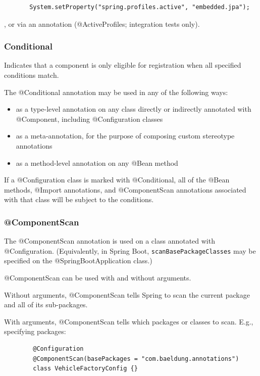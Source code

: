 \documentclass{scrartcl}
\begin{document}
   \begin{lstlisting}
       System.setProperty("spring.profiles.active", "embedded.jpa");
   \end{lstlisting}

   , or via an annotation (@ActiveProfiles; integration tests only).

\subsubsection{Conditional}

Indicates that a component is only eligible for registration when all specified conditions match.

The @Conditional annotation may be used in any of the following ways:

\begin{itemize}
    \item as a type-level annotation on any class directly or indirectly annotated with @Component, including @Configuration classes
    \item as a meta-annotation, for the purpose of composing custom stereotype annotations
    \item as a method-level annotation on any @Bean method
\end{itemize}

If a @Configuration class is marked with @Conditional, all of the @Bean methods, @Import annotations, and @ComponentScan annotations associated with that class will be subject to the conditions.

\subsubsection{@ComponentScan}

    The @ComponentScan annotation is used on a class annotated with  @Configuration. (Equivalently, in Spring Boot,  \lstinline|scanBasePackageClasses| may be specified on the  @SpringBootApplication class.)

    @ComponentScan can be used with and without arguments.

    Without arguments, @ComponentScan  tells Spring to scan the current package and all of its sub-packages.

    With arguments, @ComponentScan tells which packages or classes to scan. E.g., specifying packages:

    \begin{lstlisting}
        @Configuration
        @ComponentScan(basePackages = "com.baeldung.annotations")
        class VehicleFactoryConfig {}
    \end{lstlisting}
\end{document}
